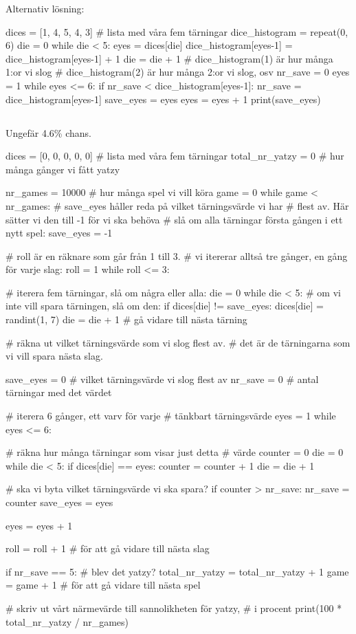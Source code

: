 Alternativ lösning:
\vspace{10pt}
\begin{python}
dices = [1, 4, 5, 4, 3] # lista med våra fem tärningar
dice_histogram = repeat(0, 6)
die = 0
while die < 5:
	eyes = dices[die]
	dice_histogram[eyes-1] = dice_histogram[eyes-1] + 1
	die = die + 1
# dice_histogram(1) är hur många 1:or vi slog
# dice_histogram(2) är hur många 2:or vi slog, osv
nr_save = 0
eyes = 1
while eyes <= 6:
	if nr_save < dice_histogram[eyes-1]:
		nr_save = dice_histogram[eyes-1]
		save_eyes = eyes
	eyes = eyes + 1
print(save_eyes)
\end{python}

\subsection*{}
Ungefär 4.6\% chans.
\vspace{10pt}
\begin{python}
dices = [0, 0, 0, 0, 0] # lista med våra fem tärningar
total_nr_yatzy = 0 # hur många gånger vi fått yatzy

nr_games = 10000 # hur många spel vi vill köra
game = 0
while game < nr_games:
  # save_eyes håller reda på vilket tärningsvärde vi har
  # flest av. Här sätter vi den till -1 för vi ska behöva
  # slå om alla tärningar första gången i ett nytt spel:
  save_eyes = -1

  # roll är en räknare som går från 1 till 3.
  # vi itererar alltså tre gånger, en gång för varje slag:
  roll = 1
  while roll <= 3:

    # iterera fem tärningar, slå om några eller alla:
    die = 0
    while die < 5:
      # om vi inte vill spara tärningen, slå om den:
      if dices[die] != save_eyes:
        dices[die] = randint(1, 7)
      die = die + 1 # gå vidare till nästa tärning

    # räkna ut vilket tärningsvärde som vi slog flest av.
    # det är de tärningarna som vi vill spara nästa slag.

    save_eyes = 0 # vilket tärningsvärde vi slog flest av
    nr_save = 0 # antal tärningar med det värdet

    # iterera 6 gånger, ett varv för varje
    # tänkbart tärningsvärde
    eyes = 1
    while eyes <= 6:

      # räkna hur många tärningar som visar just detta
      # värde
      counter = 0
      die = 0
      while die < 5:
        if dices[die] == eyes:
          counter = counter + 1
        die = die + 1

      # ska vi byta vilket tärningsvärde vi ska spara?
      if counter > nr_save:
        nr_save = counter
        save_eyes = eyes

      eyes = eyes + 1

    roll = roll + 1 # för att gå vidare till nästa slag

  if nr_save == 5: # blev det yatzy?
    total_nr_yatzy = total_nr_yatzy + 1
  game = game + 1 # för att gå vidare till nästa spel

# skriv ut vårt närmevärde till sannolikheten för yatzy,
# i procent
print(100 * total_nr_yatzy / nr_games)
\end{python}

